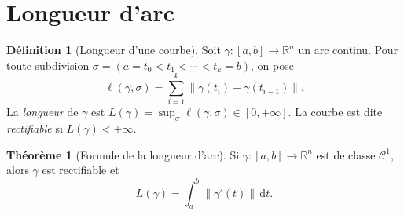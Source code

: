 \documentclass[12pt,a4paper,openany]{book}
\theoremstyle{definition}
\newtheorem{definition}{Définition}[chapter]
\newtheorem{theoreme}{Théorème}[chapter]
\newcommand{\R}{\mathbb{R}}
\newcommand{\norm}[1]{\left\lVert #1 \right\rVert}
\newcommand{\dd}{\mathrm{d}}
\begin{document}

\section{Longueur d'arc}
\label{sec:longueur-arc}


\begin{definition}[Longueur d'une courbe]\label{def:longueur-courbe}
  Soit $\gamma\colon[a,b]\to\R^n$ un arc continu. Pour toute
  subdivision $\sigma = (a = t_0 < t_1 < \cdots < t_k = b)$, on pose
  \[
    \ell(\gamma,\sigma) = \sum_{i=1}^k \norm{\gamma(t_i) - \gamma(t_{i-1})}.
  \]
  La \emph{longueur} de $\gamma$ est
  $L(\gamma) = \sup_\sigma \ell(\gamma,\sigma) \in [0, +\infty]$.
  La courbe est dite \emph{rectifiable} si
  $L(\gamma) < +\infty$.
\end{definition}

\begin{theoreme}[Formule de la longueur d'arc]
  \label{thm:longueur-arc}
  Si $\gamma\colon[a,b]\to\R^n$ est de classe $\mathcal{C}^1$, alors
  $\gamma$ est rectifiable et
  \begin{equation}\label{eq:longueur-arc}
    L(\gamma) = \int_a^b \norm{\gamma'(t)}\,\dd t.
  \end{equation}
\end{theoreme}
\end{document}
